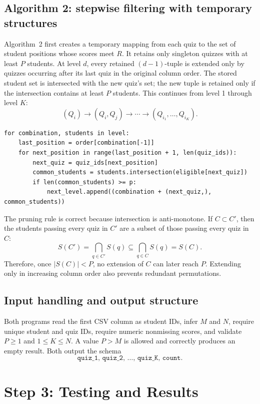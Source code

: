 \documentclass[11pt]{article}
\begin{document}
\subsection{Algorithm 2: stepwise filtering with temporary structures}
Algorithm~2 first creates a temporary mapping from each quiz to the set of student positions whose scores meet $R$. It retains only singleton quizzes with at least $P$ students. At level $d$, every retained $(d-1)$-tuple is extended only by quizzes occurring after its last quiz in the original column order. The stored student set is intersected with the new quiz's set; the new tuple is retained only if the intersection contains at least $P$ students. This continues from level 1 through level $K$:
\[
(Q_i)\longrightarrow(Q_i,Q_j)\longrightarrow\cdots\longrightarrow(Q_{i_1},\ldots,Q_{i_K}).
\]

\begin{lstlisting}
for combination, students in level:
    last_position = order[combination[-1]]
    for next_position in range(last_position + 1, len(quiz_ids)):
        next_quiz = quiz_ids[next_position]
        common_students = students.intersection(eligible[next_quiz])
        if len(common_students) >= p:
            next_level.append((combination + (next_quiz,), common_students))
\end{lstlisting}

The pruning rule is correct because intersection is anti-monotone. If $C\subset C'$, then the students passing every quiz in $C'$ are a subset of those passing every quiz in $C$:
\[
S(C')=\bigcap_{q\in C'}S(q)\subseteq\bigcap_{q\in C}S(q)=S(C).
\]
Therefore, once $|S(C)|<P$, no extension of $C$ can later reach $P$. Extending only in increasing column order also prevents redundant permutations.

\subsection{Input handling and output structure}
Both programs read the first CSV column as student IDs, infer $M$ and $N$, require unique student and quiz IDs, require numeric nonmissing scores, and validate $P\ge1$ and $1\le K\le N$. A value $P>M$ is allowed and correctly produces an empty result. Both output the schema
\[
\texttt{quiz\_1, quiz\_2, \ldots, quiz\_K, count}.
\]

\section{Step 3: Testing and Results}
\end{document}
